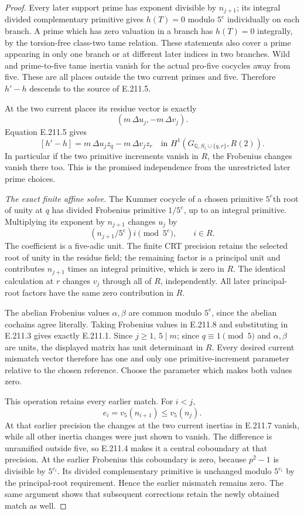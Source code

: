 \begin{proof}
Every later support prime has exponent divisible by
$n_{j+1}$; its integral divided complementary primitive gives
$h(T)=0$ modulo $5^e$ individually on each branch. A prime
which has zero valuation in a branch has $h(T)=0$ integrally,
by the torsion-free class-two tame relation. These statements
also cover a prime appearing in only one branch or at different
later indices in two branches. Wild and prime-to-five tame
inertia vanish for the actual pro-five cocycles away from five.
These are all places outside the two current primes and five.
Therefore $h'-h$ descends to the source of E.211.5.

At the two current places its residue vector is exactly
\[
                  (m\,\Delta u_j,-m\,\Delta v_j).
 \tag{E.211.7}
\]
Equation E.211.5 gives
\[
 [h'-h]=m\,\Delta u_j z_q-m\,\Delta v_j z_r
       \quad\text{in }H^1(G_{\mathbb Q,S_5\cup\{q,r\}},R(2)).
 \tag{E.211.8}
\]
In particular if the two primitive increments vanish in $R$,
the Frobenius changes vanish there too. This is the promised
independence from the unrestricted later prime choices.

\emph{The exact finite affine solve.}
The Kummer cocycle of a chosen primitive $5^e$th root of
unity at $q$ has divided Frobenius primitive $1/5^e$, up to
an integral primitive. Multiplying its exponent by
$n_{j+1}$ changes $u_j$ by
\[
                 (n_{j+1}/5^e)i\pmod{5^e},\qquad i\in R.
 \tag{E.211.9}
\]
The coefficient is a five-adic unit. The finite CRT precision
retains the selected root of unity in the residue field;
the remaining factor is a principal unit and contributes
$n_{j+1}$ times an integral primitive, which is zero in $R$.
The identical calculation at $r$ changes $v_j$ through all
of $R$, independently. All later principal-root factors
have the same zero contribution in $R$.

The abelian Frobenius values $\alpha,\beta$ are common
modulo $5^e$, since the abelian cochains agree literally.
Taking Frobenius values in E.211.8 and substituting in
E.211.3 gives exactly E.211.1. Since $j\ge1$, $5\mid m$;
since $q\equiv1\pmod5$ and $\alpha,\beta$ are units, the
displayed matrix has unit determinant in $R$. Every desired
current mismatch vector therefore has one and only one
primitive-increment parameter relative to the chosen reference.
Choose the parameter which makes both values zero.

This operation retains every earlier match. For $i<j$,
\[
                   e_i=v_5(n_{i+1})\le v_5(n_j).
 \tag{E.211.10}
\]
At that earlier precision the changes at the two current
inertias in E.211.7 vanish, while all other inertia changes
were just shown to vanish. The difference is unramified
outside five, so E.211.4 makes it a central coboundary at
that precision. At the earlier Frobenius this coboundary
is zero, because $p^2-1$ is divisible by $5^{e_i}$.
Its divided complementary primitive is unchanged modulo
$5^{e_i}$ by the principal-root requirement. Hence the
earlier mismatch remains zero. The same argument shows
that subsequent corrections retain the newly obtained
match as well.


\end{proof}
